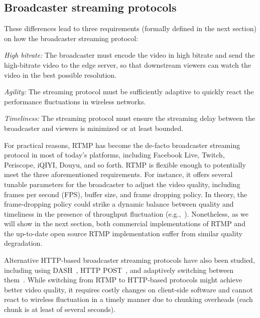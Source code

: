 \subsection{Broadcaster streaming protocols}

These differences lead to three requirements (formally defined in the next section)
on how the broadcaster streaming protocol:

\begin{packedenumerate}

\item {\em High bitrate:} The broadcaster must encode
the video in high bitrate and send the high-bitrate video
to the edge server, so that downstream viewers can watch
the video in the best possible resolution.

\item {\em Agility:} The streaming protocol must be sufficiently adaptive
to quickly react the performance fluctuations in wireless networks.

\item {\em Timeliness:} The streaming protocol must ensure the streaming
delay between the broadcaster and viewers is minimized
or at least bounded.

\end{packedenumerate}

For practical reasons, RTMP has become the de-facto
broadcaster streaming protocol in most of today's platforms,
including Facebook Live, Twitch, Periscope, iQIYI,
Douyu, and so forth.
RTMP is flexible enough to potentially meet
the three aforementioned requirements.
For instance, it offers several tunable parameters for
the broadcaster to adjust the video quality, including
frames per second (FPS), buffer size, and frame dropping
policy.
In theory, the frame-dropping policy could
strike a dynamic balance between quality and timeliness
in the presence of throughput fluctuation
(e.g.,~\cite{huang2003adaptive,krasic2003quality,singh2004dynamic}).
Nonetheless, as we will show in the next section,
both commercial implementations of RTMP and
the up-to-date open source RTMP implementation suffer from similar quality
degradation.

Alternative HTTP-based broadcaster streaming protocols have also
been studied, including using DASH~\cite{dash}, HTTP POST~\cite{seo2012experimental},
and adaptively switching between them~\cite{wilk2016leveraging}.
While switching from RTMP to HTTP-based protocols might
achieve better video quality, it requires costly
changes on client-side software and cannot react to wireless
fluctuation in a timely manner due to chunking overheads
(each chunk is at least of
several seconds).

